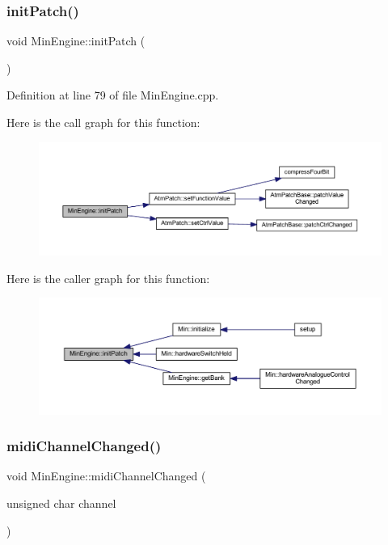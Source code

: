 \subsubsection{\texorpdfstring{init\+Patch()}{initPatch()}}
{\footnotesize\ttfamily void Min\+Engine\+::init\+Patch (\begin{DoxyParamCaption}{ }\end{DoxyParamCaption})}



Definition at line 79 of file Min\+Engine.\+cpp.

Here is the call graph for this function\+:
\nopagebreak
\begin{figure}[H]
\begin{center}
\leavevmode
\includegraphics[width=350pt]{d4/d0f/class_min_engine_afd7005953daedf58d4332627e1592c07_cgraph}
\end{center}
\end{figure}
Here is the caller graph for this function\+:
\nopagebreak
\begin{figure}[H]
\begin{center}
\leavevmode
\includegraphics[width=350pt]{d4/d0f/class_min_engine_afd7005953daedf58d4332627e1592c07_icgraph}
\end{center}
\end{figure}
\mbox{\label{class_min_engine_a5a88234cb86802788fd959d58efc9563}} 
\subsubsection{\texorpdfstring{midi\+Channel\+Changed()}{midiChannelChanged()}}
{\footnotesize\ttfamily void Min\+Engine\+::midi\+Channel\+Changed (\begin{DoxyParamCaption}\item[{unsigned char}]{channel }\end{DoxyParamCaption})\hspace{0.3cm}{\ttfamily [inline]}}



